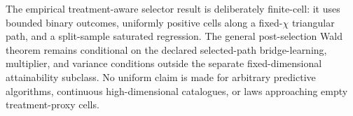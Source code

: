 The empirical treatment-aware selector result is deliberately finite-cell: it uses bounded binary outcomes, uniformly positive cells along a fixed-\(\chi\) triangular path, and a split-sample saturated regression. The general post-selection Wald theorem remains conditional on the declared selected-path bridge-learning, multiplier, and variance conditions outside the separate fixed-dimensional attainability subclass. No uniform claim is made for arbitrary predictive algorithms, continuous high-dimensional catalogues, or laws approaching empty treatment-proxy cells.